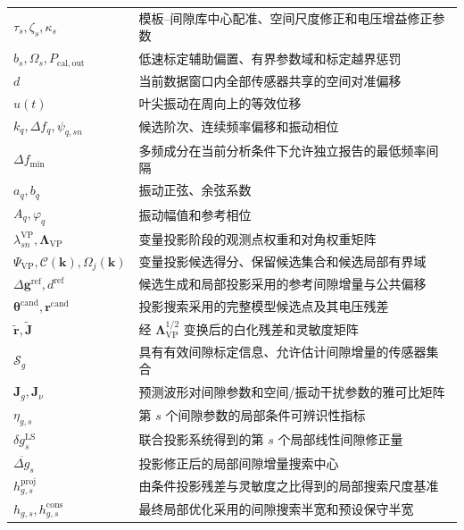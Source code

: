 \documentclass[UTF8,12pt,a4paper]{ctexart}
\begin{document}
\begin{longtable}{>{\centering\arraybackslash}p{}p{}}
$\tau_s,\zeta_s,\kappa_s$ & 模板--间隙库中心配准、空间尺度修正和电压增益修正参数\\
$b_s,\Omega_s,P_{\mathrm{cal,out}}$ & 低速标定辅助偏置、有界参数域和标定越界惩罚\\
$d$ & 当前数据窗口内全部传感器共享的空间对准偏移\\
$u(t)$ & 叶尖振动在周向上的等效位移\\
$k_q,\Delta f_q,\psi_{q,sn}$ & 候选阶次、连续频率偏移和振动相位\\
$\Delta f_{\min}$ & 多频成分在当前分析条件下允许独立报告的最低频率间隔\\
$a_q,b_q$ & 振动正弦、余弦系数\\
$A_q,\varphi_q$ & 振动幅值和参考相位\\
$\lambda_{sn}^{\mathrm{VP}},\bm\Lambda_{\mathrm{VP}}$ & 变量投影阶段的观测点权重和对角权重矩阵\\
$\Psi_{\mathrm{VP}},\mathcal C(\bm k),\Omega_j(\bm k)$ & 变量投影候选得分、保留候选集合和候选局部有界域\\
$\Delta\bm g^{\mathrm{ref}},d^{\mathrm{ref}}$ & 候选生成和局部投影采用的参考间隙增量与公共偏移\\
$\bm\theta^{\mathrm{cand}},\bm r^{\mathrm{cand}}$ & 投影搜索采用的完整模型候选点及其电压残差\\
$\widetilde{\bm r},\widetilde{\bm J}$ & 经 $\bm\Lambda_{\mathrm{VP}}^{1/2}$ 变换后的白化残差和灵敏度矩阵\\
$\mathcal S_g$ & 具有有效间隙标定信息、允许估计间隙增量的传感器集合\\
$\bm J_g,\bm J_{\nu}$ & 预测波形对间隙参数和空间/振动干扰参数的雅可比矩阵\\
$\eta_{g,s}$ & 第 $s$ 个间隙参数的局部条件可辨识性指标\\
$\delta g_s^{\mathrm{LS}}$ & 联合投影系统得到的第 $s$ 个局部线性间隙修正量\\
$\overline{\Delta g}_s$ & 投影修正后的局部间隙增量搜索中心\\
$h_{g,s}^{\mathrm{proj}}$ & 由条件投影残差与灵敏度之比得到的局部搜索尺度基准\\
$h_{g,s},h_{g,s}^{\mathrm{cons}}$ & 最终局部优化采用的间隙搜索半宽和预设保守半宽\\
\bottomrule
\end{longtable}
\end{document}
